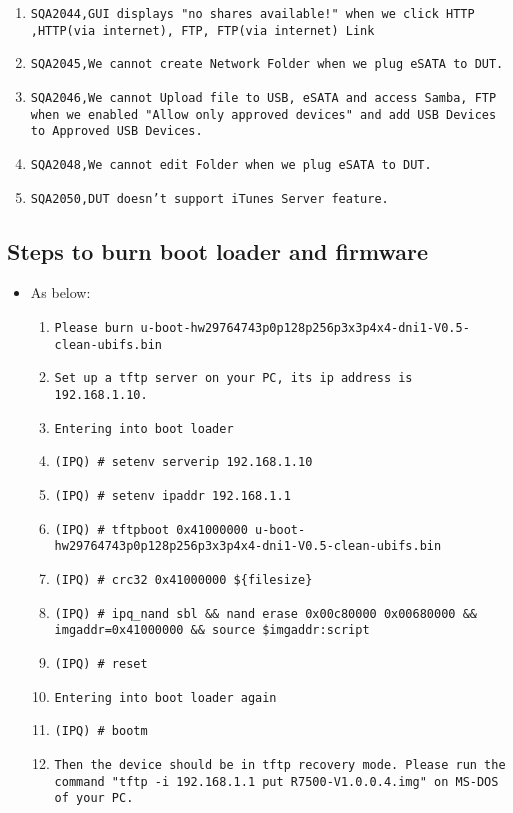 \documentclass[12pt]{report}
\begin{document}
\begin{itemize}
\begin{enumerate}
		\item \texttt{SQA2044,GUI displays "no shares available!" when we click HTTP ,HTTP(via internet), FTP, FTP(via internet) Link}
		\item \texttt{SQA2045,We cannot create Network Folder when we plug eSATA to DUT.}
		\item \texttt{SQA2046,We cannot Upload file to USB, eSATA and access Samba, FTP when we enabled "Allow only approved devices" and add USB Devices to Approved USB Devices.}
		\item \texttt{SQA2048,We cannot edit Folder when we plug eSATA to DUT.}
		\item \texttt{SQA2050,DUT doesn't support iTunes Server feature.}
    	\end{enumerate}
    \end{itemize}

    \subsection{Steps to burn boot loader and firmware}
    \begin{itemize}
    \item As below:
            \begin{enumerate}
	    	\item \texttt{Please burn u-boot-hw29764743p0p128p256p3x3p4x4-dni1-V0.5-clean-ubifs.bin}
		\item \texttt{Set up a tftp server on your PC, its ip address is 192.168.1.10.}
		\item \texttt{Entering into boot loader}
		\item \texttt{(IPQ) \# setenv serverip 192.168.1.10}
		\item \texttt{(IPQ) \# setenv ipaddr 192.168.1.1}
		\item \texttt{(IPQ) \# tftpboot 0x41000000 u-boot-hw29764743p0p128p256p3x3p4x4-dni1-V0.5-clean-ubifs.bin}
		\item \texttt{(IPQ) \# crc32 0x41000000 \$\{filesize\}}
		\item \texttt{(IPQ) \# ipq\_nand sbl \&\& nand erase 0x00c80000 0x00680000 \&\& imgaddr=0x41000000 \&\& source \$imgaddr:script}
		\item \texttt{(IPQ) \# reset}
		\item \texttt{Entering into boot loader again}
		\item \texttt{(IPQ) \# bootm}
		\item \texttt{Then the device should be in tftp recovery mode. Please run the command "tftp -i 192.168.1.1 put R7500-V1.0.0.4.img" on MS-DOS of your PC.}
            \end{enumerate}
    \end{itemize}
\end{document}
